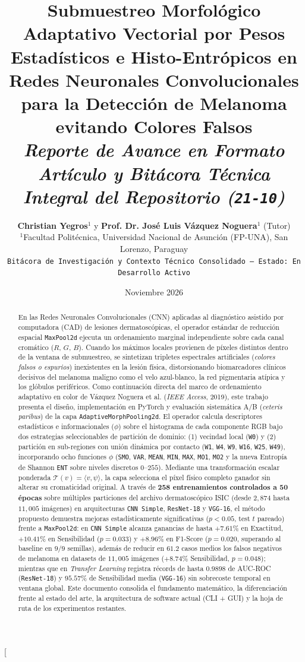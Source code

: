 \documentclass[10pt,a4paper,twocolumn]{article}
\title{\vspace{-0.6cm}\textbf{Submuestreo Morfológico Adaptativo Vectorial por Pesos Estadísticos e Histo-Entrópicos en Redes Neuronales Convolucionales para la Detección de Melanoma evitando Colores Falsos}\\[0.25cm]
\large \textit{Reporte de Avance en Formato Artículo y Bitácora Técnica Integral del Repositorio (\texttt{21-10})}}
\author{
\textbf{Christian Yegros}$^{1}$ \quad y \quad \textbf{Prof. Dr. José Luis Vázquez Noguera}$^{1}$ (Tutor)\\[0.15cm]
\small $^{1}$Facultad Politécnica, Universidad Nacional de Asunción (FP-UNA), San Lorenzo, Paraguay\\
\small \texttt{Bitácora de Investigación y Contexto Técnico Consolidado — Estado: En Desarrollo Activo}
}
\date{Noviembre 2026}
\begin{document}
\twocolumn[
  \begin{@twocolumnfalse}
    \maketitle
    \vspace{-0.4cm}
    \begin{abstract}
      \noindent En las Redes Neuronales Convolucionales (CNN) aplicadas al diagnóstico asistido por computadora (CAD) de lesiones dermatoscópicas, el operador estándar de reducción espacial \texttt{MaxPool2d} ejecuta un ordenamiento marginal independiente sobre cada canal cromático ($R$, $G$, $B$). Cuando los máximos locales provienen de píxeles distintos dentro de la ventana de submuestreo, se sintetizan tripletes espectrales artificiales (\emph{colores falsos o espurios}) inexistentes en la lesión física, distorsionando biomarcadores clínicos decisivos del melanoma maligno como el velo azul-blanco, la red pigmentaria atípica y los glóbulos periféricos. Como continuación directa del marco de ordenamiento adaptativo en color de Vázquez Noguera et al. (\emph{IEEE Access}, 2019), este trabajo presenta el diseño, implementación en PyTorch y evaluación sistemática A/B (\emph{ceteris paribus}) de la capa \texttt{AdaptiveMorphPooling2d}. El operador calcula descriptores estadísticos e informacionales ($\phi$) sobre el histograma de cada componente RGB bajo dos estrategias seleccionables de partición de dominio: (1) vecindad local (\texttt{W0}) y (2) partición en sub-regiones con unión dinámica por contacto (\texttt{W1}, \texttt{W4}, \texttt{W9}, \texttt{W16}, \texttt{W25}, \texttt{W49}), incorporando ocho funciones $\phi$ (\texttt{SMO}, \texttt{VAR}, \texttt{MEAN}, \texttt{MIN}, \texttt{MAX}, \texttt{MO1}, \texttt{MO2} y la nueva Entropía de Shannon \texttt{ENT} sobre niveles discretos $0\text{--}255$). Mediante una transformación escalar ponderada $\mathcal{T}(v)=\langle v,\psi\rangle$, la capa selecciona el píxel físico completo ganador sin alterar su cromaticidad original. A través de \textbf{258 entrenamientos controlados a 50 épocas} sobre múltiples particiones del archivo dermatoscópico ISIC (desde $2{,}874$ hasta $11{,}005$ imágenes) en arquitecturas \texttt{CNN Simple}, \texttt{ResNet-18} y \texttt{VGG-16}, el método propuesto demuestra mejoras estadísticamente significativas ($p < 0.05$, test $t$ pareado) frente a \texttt{MaxPool2d}: en \texttt{CNN Simple} alcanza ganancias de hasta $+7.61\%$ en Exactitud, $+10.41\%$ en Sensibilidad ($p=0.033$) y $+8.96\%$ en F1-Score ($p=0.020$, superando al baseline en $9/9$ semillas), además de reducir en $61.2$ casos medios los falsos negativos de melanoma en datasets de $11{,}005$ imágenes ($+8.74\%$ Sensibilidad, $p=0.048$); mientras que en \emph{Transfer Learning} registra récords de hasta $0.9898$ de AUC-ROC (\texttt{ResNet-18}) y $95.57\%$ de Sensibilidad media (\texttt{VGG-16}) sin sobrecoste temporal en ventana global. Este documento consolida el fundamento matemático, la diferenciación frente al estado del arte, la arquitectura de software actual (CLI + GUI) y la hoja de ruta de los experimentos restantes.

\end{abstract}
\end{@twocolumnfalse}
\end{document}
